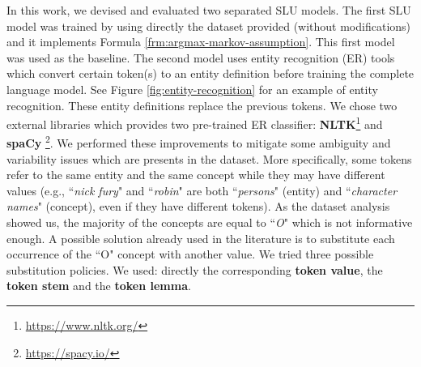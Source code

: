 \documentclass[11pt,a4paper]{article}
\begin{document}
In this work, we devised and evaluated two separated SLU models. 
The first SLU model was trained by using directly the dataset provided (without modifications) and it 
implements Formula \ref{frm:argmax-markov-assumption}. 
This first model was used as the baseline. The second model uses entity recognition (ER) tools which convert certain token(s) to an entity definition before training the complete language model. See Figure \ref{fig:entity-recognition} for an example of entity recognition. These entity definitions replace the previous tokens. We chose two external libraries which provides two pre-trained ER classifier: \textbf{NLTK}\footnote{\url{https://www.nltk.org/}} and \textbf{spaCy} \footnote{\url{https://spacy.io/}}. 
We performed these improvements to mitigate some ambiguity and variability issues which are presents in the dataset. 
More specifically, some tokens refer to the same entity 
and the same concept while they may have different values 
(e.g., ``\textit{nick fury}" and ``\textit{robin}" are both 
``\textit{persons}" (entity) and ``\textit{character names}" (concept), even if  they have different tokens). 
As the dataset analysis showed us, the majority of the concepts are equal to ``\textit{O}" which is not informative enough. A possible solution already used in the literature is to substitute each occurrence of the  ``O" concept with another value. We tried three possible substitution policies. We used: 
directly the corresponding \textbf{token value}, the \textbf{token stem} and the \textbf{token lemma}.
 
\end{document}
